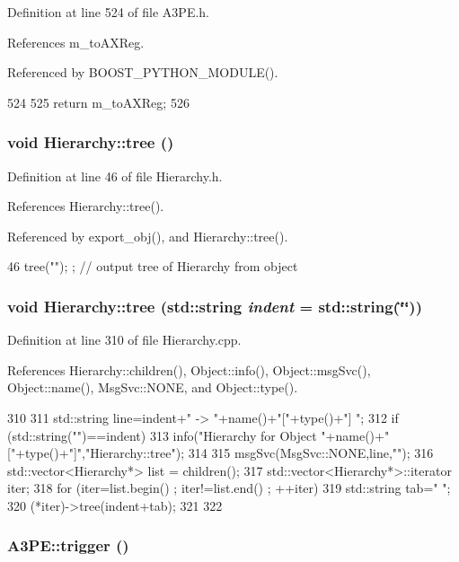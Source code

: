 Definition at line 524 of file A3PE.h.

References m\_\-toAXReg.

Referenced by BOOST\_\-PYTHON\_\-MODULE().


\begin{DoxyCode}
524                      {
525     return m_toAXReg;
526   }
\end{DoxyCode}
\hypertarget{classHierarchy_a594c294c5f60c230e106d522ed008212}{
\subsubsection[{tree}]{\setlength{\rightskip}{0pt plus 5cm}void Hierarchy::tree ()}}
\label{classHierarchy_a594c294c5f60c230e106d522ed008212}


Definition at line 46 of file Hierarchy.h.

References Hierarchy::tree().

Referenced by export\_\-obj(), and Hierarchy::tree().


\begin{DoxyCode}
46 { tree(""); };                     // output tree of Hierarchy from object
\end{DoxyCode}
\hypertarget{classHierarchy_a76e914b9a677a22a82deb74d892bf261}{
\subsubsection[{tree}]{\setlength{\rightskip}{0pt plus 5cm}void Hierarchy::tree (std::string {\em indent} = {\ttfamily std::string(\char`\"{}\char`\"{})})}}
\label{classHierarchy_a76e914b9a677a22a82deb74d892bf261}


Definition at line 310 of file Hierarchy.cpp.

References Hierarchy::children(), Object::info(), Object::msgSvc(), Object::name(), MsgSvc::NONE, and Object::type().


\begin{DoxyCode}
310                                     {
311   std::string line=indent+" -> "+name()+"["+type()+"] ";
312   if (std::string("")==indent){
313     info("Hierarchy for Object "+name()+"["+type()+"]","Hierarchy::tree");
314   }
315   msgSvc(MsgSvc::NONE,line,"");
316   std::vector<Hierarchy*> list = children();
317   std::vector<Hierarchy*>::iterator iter;
318   for (iter=list.begin() ; iter!=list.end() ; ++iter){
319     std::string tab="  ";
320     (*iter)->tree(indent+tab);
321   }
322 }
\end{DoxyCode}
\hypertarget{classA3PE_a75cd0377eb653ed22c4d258ab359f3d6}{
\subsubsection[{trigger}]{ A3PE::trigger ()}}
\label{classA3PE_a75cd0377eb653ed22c4d258ab359f3d6}



